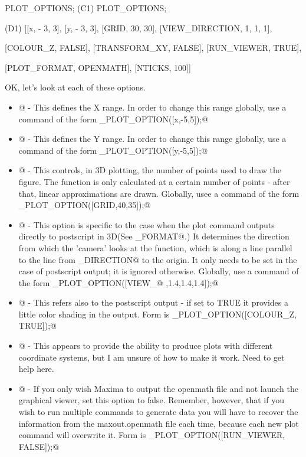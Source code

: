 \beginmaximasession
PLOT_OPTIONS;
\maximasession
(C1) PLOT_OPTIONS;

(D1) [[x, - 3, 3], [y, - 3, 3], [GRID, 30, 30], [VIEW_DIRECTION, 1, 1, 1], 

[COLOUR_Z, FALSE], [TRANSFORM_XY, FALSE], [RUN_VIEWER, TRUE], 

[PLOT_FORMAT, OPENMATH], [NTICKS, 100]]
\endmaximasession

OK, let's look at each of these options.

\begin{itemize}
  \item \verb@[x, - 3, 3]@ - This defines the X range.  In order to change this range globally, use a command of the form \verb@SET_PLOT_OPTION([x,-5,5]);@
  \item \verb@[y, - 3, 3]@ - This defines the Y range.  In order to change this range globally, use a command of the form \verb@SET_PLOT_OPTION([y,-5,5]);@
  \item \verb@[GRID, 30, 30]@ - This controls, in 3D plotting, the number of points used to draw the figure.  The function is only calculated at a certain number of points - after that, linear approximations are drawn. Globally, usee a command of the form \verb@SET_PLOT_OPTION([GRID,40,35]);@
  \item {}@ - This option is specific to the case
  when the plot command outputs directly to postscript in 3D(See
  \verb@PLOT_FORMAT@.)  It determines the direction from which the 'camera'
  looks at the function, which is along a line parallel to the line from
  \verb@VIEW_DIRECTION@ to the origin.  It only needs to be set in the case of
  postscript output; it is ignored otherwise.  Globally, use a command of the
  form \verb@SET_PLOT_OPTION([VIEW_@ \verb@DIRECTION,1.4,1.4,1.4]);@
  \item {}@ - This refers also to the postscript output - if set to TRUE it provides a little color shading in the output. Form is \verb@SET_PLOT_OPTION([COLOUR_Z, TRUE]);@
  \item {}@ - This appears to provide the ability to produce plots with different coordinate systems, but I am unsure of how to make it work.  Need to get help here.
  \item {}@ - If you only wish Maxima to output the openmath file and not launch the graphical viewer, set this option to false.  Remember, however, that if you wish to run multiple commands to generate data you will have to recover the information from the maxout.openmath file each time, because each new plot command will overwrite it. Form is \verb@SET_PLOT_OPTION([RUN_VIEWER, FALSE]);@

\end{itemize}
